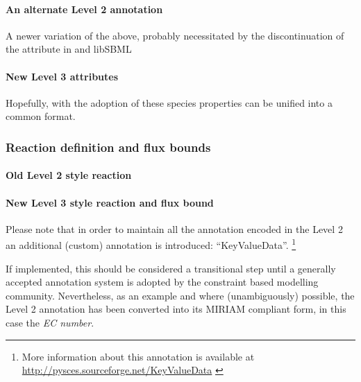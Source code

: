 \paragraph{An alternate \SBML Level 2 \Species annotation}
A newer variation of the above, probably necessitated by the discontinuation of the  attribute in \SBML and \textsf{libSBML}
%

\paragraph{New \SBML Level 3 \Species attributes}
Hopefully, with the adoption of \SBML \FBC these species properties can be unified into a common format.
%



\newpage
\subsubsection*{Reaction definition and flux bounds}
\paragraph{Old \SBML Level 2 style reaction}
\newpage
\paragraph{New \SBML Level 3 style reaction and flux bound}
Please note that in order to maintain all the annotation encoded in the \SBML Level 2 \Reaction {} an additional (custom) annotation is introduced: ``KeyValueData''. \footnote{More information about this annotation is available at \url{http://pysces.sourceforge.net/KeyValueData} \cite{cbmpy}}

If implemented, this should be considered a transitional step until a generally accepted annotation system is adopted by the constraint based modelling community. Nevertheless, as an example and where (unambiguously) possible, the \SBML Level 2 annotation has been converted into its MIRIAM compliant form, in this case the \textit{EC number}.

